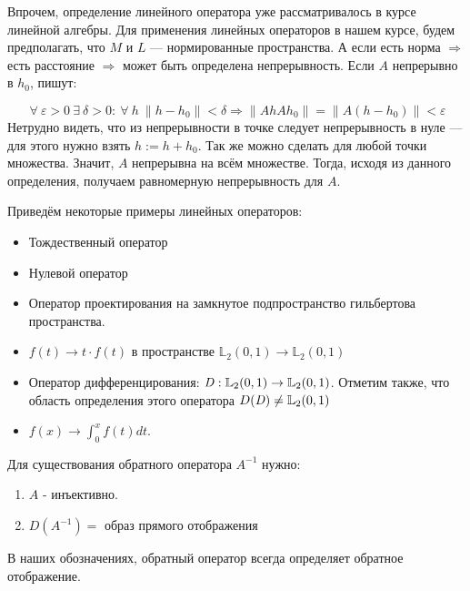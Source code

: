 \documentclass[12pt]{article}
\let\existstemp\exists
\let\foralltemp\forall
\renewcommand{\exists}{\: \existstemp \:}
\renewcommand{\forall}{\: \foralltemp \:}
\newcommand{\norm}[1]{\| #1 \|}
\begin{document}
	Впрочем, определение линейного оператора уже рассматривалось в курсе линейной алгебры. Для применения линейных операторов в
	нашем курсе, будем предполагать, что $M$ и $L$ --- нормированные пространства. А если есть норма $\Rightarrow$ есть расстояние
	$\Rightarrow$ может быть определена непрерывность. Если $A$ непрерывно в $h_0$, пишут:
	
	$$ \forall \varepsilon > 0 \exists \delta > 0 : \forall h \: \norm{h - h_0} < \delta \Rightarrow \norm{Ah  Ah_0} 
	= \norm{A(h-h_0)} < \varepsilon $$
	Нетрудно видеть, что из непрерывности в точке следует непрерывность в нуле --- для этого нужно взять $h := h + h_0$. 
	Так же можно сделать для любой точки множества. Значит, $A$ непрерывна на всём множестве. Тогда, исходя из данного
	определения, получаем равномерную непрерывность для $A$.
	
	Приведём некоторые примеры линейных операторов:
	\begin{itemize}
		\item Тождественный оператор
		\item Нулевой оператор
		\item Оператор проектирования на замкнутое подпространство гильбертова пространства.
		\item $f(t) \rightarrow t \cdot f(t)$ в пространстве $\mathbb{L}_2 (0,1) \rightarrow \mathbb{L}_2 (0,1)$
		\item Оператор дифференцирования: $\text{\emph{D}}: \mathbb{L}_2 (0,1) \rightarrow \mathbb{L}_2 (0,1)$. Отметим также, что
		область определения этого оператора $D(\text{\emph{D}}) \neq \mathbb{L}_2 (0,1)$
		\item $f(x) \rightarrow \int_0^x f(t) dt$.
	\end{itemize}
	
	Для существования обратного оператора $A^{-1}$ нужно:
	\begin{enumerate}
		\item $A$ - инъективно.
		\item $D(A^{-1}) = $ образ прямого отображения
	\end{enumerate}
	В наших обозначениях, обратный оператор всегда определяет обратное отображение.
	
\end{document}
